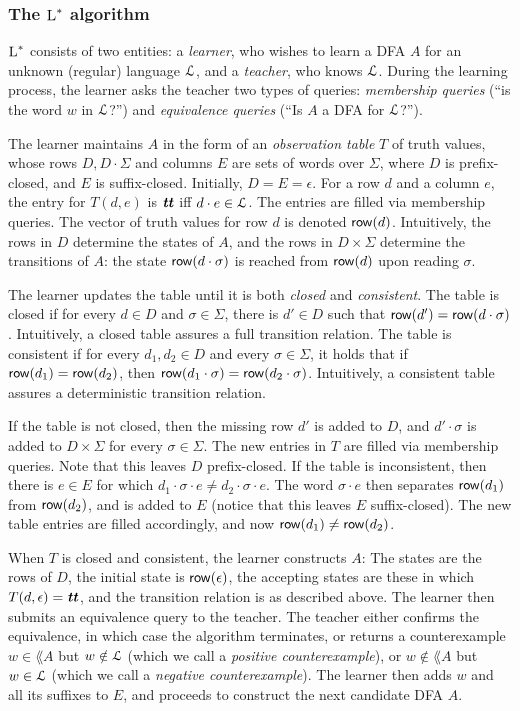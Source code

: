 \subsubsection{The $\textsc{L}^*$ algorithm}

$\textsc{L}^*$ consists of two entities: a {\em learner}, who wishes to learn a DFA $A$ for an unknown (regular) language $\cal L$, and a {\em teacher}, who knows $\cal L$.
During the learning process, the learner asks the teacher two types of queries: {\em membership queries} (``is the word $w$ in $\cal L$?'') and {\em equivalence queries} (``Is $A$ a DFA for $\cal L$?'').

The learner maintains $A$ in the form of an {\em observation table} $T$ of truth values, whose rows $D, D\cdot\Sigma$ and columns $E$ are sets of words over $\Sigma$, where $D$ is prefix-closed, and $E$ is suffix-closed. Initially, $D = E = {\epsilon}$. 
For a row $d$ and a column $e$, the entry for $T(d,e)$ is $\textbf{\textit{tt}}$ iff $d\cdot e \in{\cal L}$. The entries are filled via membership queries.
The vector of truth values for row $d$ is denoted $\mathsf{row}(d)$. Intuitively, the rows in $D$ determine the states of $A$, and the rows in $D\times\Sigma$ determine the transitions of $A$: the state $\mathsf{row}(d\cdot\sigma)$ is reached from $\mathsf{row}(d)$ upon reading $\sigma$. 

The learner updates the table until it is both {\em closed} and {\em consistent}. The table is closed if for every $d\in D$ and $\sigma\in \Sigma$, there is $d'\in D$ such that $\mathsf{row}(d') = \mathsf{row}(d\cdot\sigma)$. Intuitively, a closed table assures a full transition relation.
The table is consistent if for every $d_1,d_2\in D$ and every $\sigma \in \Sigma$, it holds that if $\mathsf{row}(d_1) = \mathsf{row}(d_2)$, then $\mathsf{row}(d_1\cdot\sigma) = \mathsf{row}(d_2\cdot\sigma)$. Intuitively, a consistent table assures a deterministic transition relation. 

If the table is not closed, then the missing row $d'$ is added to $D$, and $d'\cdot\sigma$ is added to $D\times\Sigma$ for every $\sigma\in \Sigma$. The new entries in $T$ are filled via membership queries. Note that this leaves $D$ prefix-closed.
If the table is inconsistent, then there is $e\in E$ for which $d_1\cdot\sigma\cdot e \neq d_2\cdot\sigma\cdot e$. The word $\sigma\cdot e$ then separates $\mathsf{row}(d_1)$ from $\mathsf{row}(d_2)$, and is added to $E$ (notice that this leaves $E$ suffix-closed). The new table entries are filled accordingly, and now $\mathsf{row}(d_1)\neq \mathsf{row}(d_2)$. 

When $T$ is closed and consistent, the learner constructs $A$: The states are the rows of $D$, the initial state is $\mathsf{row}(\epsilon)$, the accepting states are these in which $T(d,\epsilon) = \textbf{\textit{tt}}$, and the transition relation is as described above. The learner then submits an equivalence query to the teacher. The teacher either confirms the equivalence, in which case the algorithm terminates, or returns a counterexample $w\in \lang{A}$ but $w\notin {\cal L}$ (which we call a {\em positive counterexample}), or $w\notin \lang{A}$ but $w\in {\cal L}$ (which we call a {\em negative counterexample}). The learner then adds $w$ and all its suffixes to $E$, and proceeds to construct the next candidate DFA $A$. 

